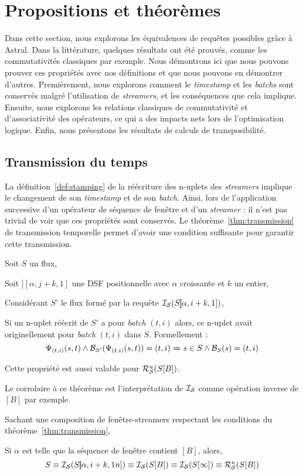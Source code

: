 \section{Propositions et théorèmes}\label{sec:valid:expressivite:theoremes}
Dans cette section, nous explorons les équivalences de requêtes possibles grâce à Astral. Dans la littérature, quelques résultats ont été prouvés, comme les commutativités classiques par exemple. Nous démontrons ici que nous pouvons prouver ces propriétés avec nos définitions et que nous pouvons en démontrer d'autres. Premièrement, nous explorons comment le \textit{timestamp} et les \textit{batchs} sont conservés malgré l'utilisation de \textit{streamers}, et les conséquences que cela implique. Ensuite, nous explorons les relations classiques de commutativité et d'associativité des opérateurs, ce qui a des impacts nets lors de l'optimisation logique. Enfin, nous présentons les résultats de calculs de transposibilité.

\subsection{Transmission du temps}
La définition~\ref{def:stamping} de la réécriture des n-uplets des \textit{streamers} implique le changement de son \textit{timestamp} et de son \textit{batch}. Ainsi, lors de l'application successive d'un opérateur de séquence de fenêtre et d'un \textit{streamer} : il n'est pas trivial de voir que ces propriétés sont conservés. Le théorème~\ref{thm:transmission} de transmission temporelle permet d'avoir une condition suffisante pour garantir cette transmission.

\begin{thm}\label{thm:transmission}
    Soit $S$ un flux,

    Soit $]\!\![\alpha,j+k,1]$ une DSF positionnelle avec $\alpha$ croissante et $k$ un entier, 

    Considérant $S'$ le flux formé par la requête $\mathcal{I_S}(S]\!\![\alpha,i+k,1])$,

    Si un n-uplet réécrit de $S'$ a pour \textit{batch} $(t,i)$ alors, ce n-uplet avait originellement pour \textit{batch} $(t,i)$ dans $S$. Formellement :
$$\Psi_{(t,i)}(s,t) \wedge \mathcal{B}_{S'}(\Psi_{(t,i)}(s,t)) = (t,i) \Rightarrow s\in S \wedge \mathcal{B}_S(s) = (t,i)$$

    Cette propriété est aussi valable pour $\mathcal{R}_{\mathcal S}^{u}(S[B])$.
\end{thm}

Le corrolaire à ce théorème est l'interprétation de $\mathcal{I_S}$ comme opération inverse de $[B]$ par exemple.
\begin{coro}
    Sachant une composition de fenêtre-streamers respectant les conditions du théorème~\ref{thm:transmission},

    Si $\alpha$ est telle que la séquence de fenêtre contient $[B]$, alors,
$$S \equiv \mathcal{I_S}(S]\!\![\alpha,i+k,1n]) \equiv \mathcal{I_S}(S[B]) \equiv \mathcal{I_S}(S[\infty]) \equiv \mathcal{R}_{\mathcal S}^{u}(S[B])$$
\end{coro}


